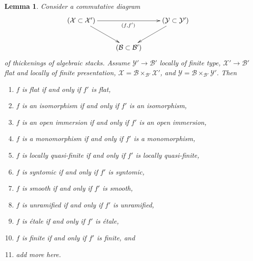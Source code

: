 \documentclass{stacks-project}
\theoremstyle{plain}
\newtheorem{lemma}[subsection]{Lemma}
\theoremstyle{definition}
\theoremstyle{remark}
\numberwithin{equation}{subsection}
\begin{document}
\begin{lemma}
\label{lemma-deform-property-fp-over-ft}
Consider a commutative diagram
$$
\xymatrix{
(\mathcal{X} \subset \mathcal{X}') \ar[rr]_{(f, f')} \ar[rd] & &
(\mathcal{Y} \subset \mathcal{Y}') \ar[ld] \\
& (\mathcal{B} \subset \mathcal{B}')
}
$$
of thickenings of algebraic stacks.
Assume $\mathcal{Y}' \to \mathcal{B}'$ locally of finite type,
$\mathcal{X}' \to \mathcal{B}'$ flat and locally of finite presentation,
$\mathcal{X} = \mathcal{B} \times_{\mathcal{B}'} \mathcal{X}'$, and
$\mathcal{Y} = \mathcal{B} \times_{\mathcal{B}'} \mathcal{Y}'$. Then
\begin{enumerate}
\item $f$ is flat if and only if $f'$ is flat,
\label{item-flat-fp-over-ft}
\item $f$ is an isomorphism if and only if $f'$ is an isomorphism,
\label{item-isomorphism-fp-over-ft}
\item $f$ is an open immersion if and only if $f'$ is an open immersion,
\label{item-open-immersion-fp-over-ft}
\item $f$ is a monomorphism if and only if $f'$ is a monomorphism,
\label{item-monomorphism-fp-over-ft}
\item $f$ is locally quasi-finite if and only if $f'$ is locally quasi-finite,
\label{item-quasi-finite-fp-over-ft}
\item $f$ is syntomic if and only if $f'$ is syntomic,
\label{item-syntomic-fp-over-ft}
\item $f$ is smooth if and only if $f'$ is smooth,
\label{item-smooth-fp-over-ft}
\item $f$ is unramified if and only if $f'$ is unramified,
\label{item-unramified-fp-over-ft}
\item $f$ is \'etale if and only if $f'$ is \'etale,
\label{item-etale-fp-over-ft}
\item $f$ is finite if and only if $f'$ is finite, and
\label{item-finite-fp-over-ft}
\item add more here.
\end{enumerate}
\end{lemma}
\end{document}
